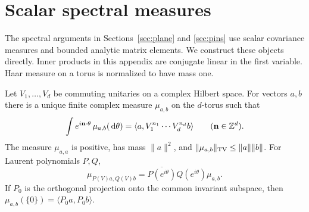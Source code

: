 \section{Scalar spectral measures}\label{sec:scalar-spectra}

The spectral arguments in Sections~\ref{sec:plane} and \ref{sec:pins}
use scalar covariance measures and bounded analytic matrix elements.
We construct these objects directly.  Inner products in this appendix
are conjugate linear in the first variable.  Haar measure on a torus
is normalized to have mass one.

\begin{lemma}\label{spectra:unitary}
Let $V_1,\ldots,V_d$ be commuting unitaries on a complex Hilbert space.
For vectors $a,b$ there is a unique finite complex measure $\mu_{a,b}$
on the $d$-torus such that
\[
 \int e^{i\mathbf n\cdot\theta}\,\mu_{a,b}(\,\mathrm d\theta)
   =\langle a,V_1^{n_1}\cdots V_d^{n_d}b\rangle
 \qquad(\mathbf n\in\mathbb Z^d).
\]
The measure $\mu_{a,a}$ is positive, has mass $\|a\|^2$, and
$\|\mu_{a,b}\|_{\mathrm{TV}}\le\|a\|\|b\|$.  For Laurent polynomials $P,Q$,
\[
 \mu_{P(V)a,Q(V)b}
   =\overline{P(e^{i\theta})}Q(e^{i\theta})\mu_{a,b}.
\]
If $P_0$ is the orthogonal projection onto the common invariant
subspace, then $\mu_{a,b}(\{0\})=\langle P_0a,P_0b\rangle$.
\end{lemma}

